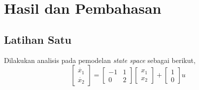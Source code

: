 \documentclass[../main.tex]{subfiles}
\begin{document}
    \section{Hasil dan Pembahasan}
        \subsection{Latihan Satu}
            Dilakukan analisis pada pemodelan \textit{state space} sebagai berikut,
            \begin{equation}
                \begin{bmatrix} \dot{x_1} \\ \dot{x_2} \end{bmatrix} = \begin{bmatrix} -1 & 1 \\ 0 & 2\end{bmatrix} \begin{bmatrix} x_1 \\ x_2 \end{bmatrix} + \begin{bmatrix} 1 \\ 0\end{bmatrix} u
                \label{persamaan_4}
            \end{equation}
\end{document}
